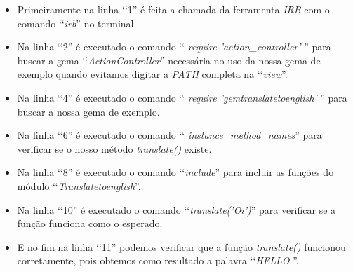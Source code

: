 \begin{itemize}

 \item Primeiramente na linha ‘‘1'' é feita a chamada da ferramenta \emph{IRB} com o comando ‘‘\emph{irb}''
  no terminal.

  \item Na linha ‘‘2'' é executado o comando ‘‘ \emph{require 'action\_controller'} '' para buscar a gema
  ‘‘\emph{ActionController}'' necessária no uso da nossa gema de exemplo quando evitamos digitar a
  \emph{PATH} completa na ‘‘\emph{view}''.

  \item Na linha ‘‘4'' é executado o comando ‘‘ \emph{require 'gemtranslatetoenglish'} '' para buscar a
  nossa gema de exemplo.

  \item Na linha ‘‘6'' é executado o comando
  ‘‘ \emph{instance\_method\_names}'' para verificar se o nosso método \emph{translate()} existe.

  \item Na linha ‘‘8'' é executado o comando ‘‘\emph{include}'' para incluir as funções do módulo
  ‘‘\emph{Translatetoenglish}''.

  \item Na linha ‘‘10'' é executado o comando
  ‘‘\emph{translate('Oi')}'' para verificar se a função funciona como o esperado.

  \item E no fim na linha ‘‘11'' podemos verificar que a função \emph{translate()} funcionou corretamente,
  pois obtemos como resultado a palavra ‘‘\emph{HELLO }''.

 \end{itemize}
